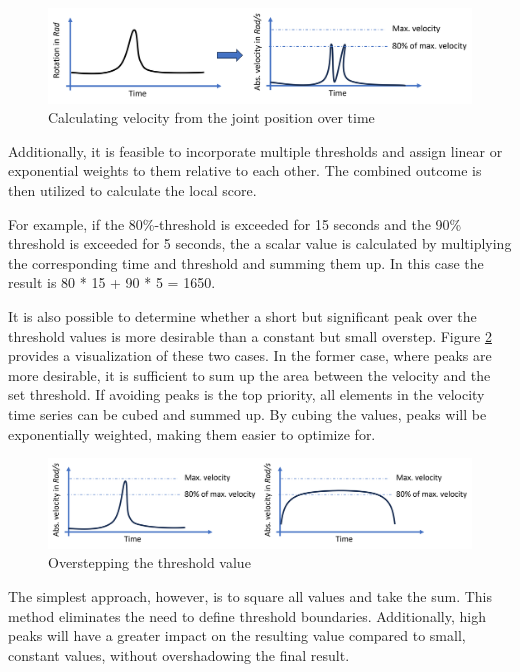 \begin{figure}[H]
	\centerline{\includegraphics[width=1\textwidth]{figures/veloy.png}}
	\caption{Calculating velocity from the joint position over time}
	\label{velo}
\end{figure}

Additionally, it is feasible to incorporate multiple thresholds and assign linear or exponential weights to them relative to each other. The combined outcome is then utilized to calculate the local score.


For example, if the 80\%-threshold is exceeded for 15 seconds and the 90\% threshold is exceeded for 5 seconds, the a scalar value is calculated by multiplying the corresponding time and threshold and summing them up. In this case the result is 80 * 15 + 90 * 5 = 1650.

It is also possible to determine whether a short but significant peak over the threshold values is more desirable than a constant but small overstep. Figure \ref{peaklong} provides a visualization of these two cases. In the former case, where peaks are more desirable, it is sufficient to sum up the area between the velocity and the set threshold. If avoiding peaks is the top priority, all elements in the velocity time series can be cubed and summed up. By cubing the values, peaks will be exponentially weighted, making them easier to optimize for.

\begin{figure}[H]
	\centerline{\includegraphics[width=1\textwidth]{figures/peaklong.png}}
	\caption{Overstepping the threshold value}
	\label{peaklong}
\end{figure}


The simplest approach, however, is to square all values and take the sum. This method eliminates the need to define threshold boundaries. Additionally, high peaks will have a greater impact on the resulting value compared to small, constant values, without overshadowing the final result.

